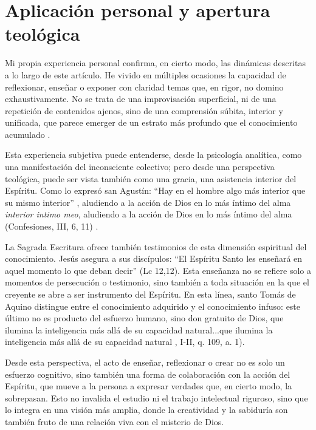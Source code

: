 \documentclass[a4paper,12pt]{article}
\begin{document}
\section*{Aplicación personal y apertura teológica}

Mi propia experiencia personal confirma, en cierto modo, las dinámicas descritas a lo largo de este artículo. He vivido en múltiples ocasiones la capacidad de reflexionar, enseñar o exponer con claridad temas que, en rigor, no domino exhaustivamente. No se trata de una improvisación superficial, ni de una repetición de contenidos ajenos, sino de una comprensión súbita, interior y unificada, que parece emerger de un estrato más profundo que el conocimiento acumulado \cite{jung1959}.

Esta experiencia subjetiva puede entenderse, desde la psicología analítica, como una manifestación del inconsciente colectivo; pero desde una perspectiva teológica, puede ser vista también como una gracia, una asistencia interior del Espíritu. Como lo expresó san Agustín: “Hay en el hombre algo más interior que su mismo interior” , aludiendo a la acción de Dios en lo más íntimo del alma \cite{agustinconf}
\textit{interior intimo meo}, aludiendo a la acción de Dios en lo más íntimo del alma (Confesiones, III, 6, 11) \cite{jung1959}.


La Sagrada Escritura ofrece también testimonios de esta dimensión espiritual del conocimiento. Jesús asegura a sus discípulos: “El Espíritu Santo les enseñará en aquel momento lo que deban decir” \cite{bibid}(Lc 12,12). Esta enseñanza no se refiere solo a momentos de persecución o testimonio, sino también a toda situación en la que el creyente se abre a ser instrumento del Espíritu. En esta línea, santo Tomás de Aquino distingue entre el conocimiento adquirido y el conocimiento infuso: este último no es producto del esfuerzo humano, sino don gratuito de Dios, que ilumina la inteligencia más allá de su capacidad natural...que ilumina la inteligencia más allá de su capacidad natural \cite{sto2006}, I-II, q. 109, a. 1).

Desde esta perspectiva, el acto de enseñar, reflexionar o crear no es solo un esfuerzo cognitivo, sino también una forma de colaboración con la acción del Espíritu, que mueve a la persona a expresar verdades que, en cierto modo, la sobrepasan. Esto no invalida el estudio ni el trabajo intelectual riguroso, sino que lo integra en una visión más amplia, donde la creatividad y la sabiduría son también fruto de una relación viva con el misterio de Dios.
\end{document}
